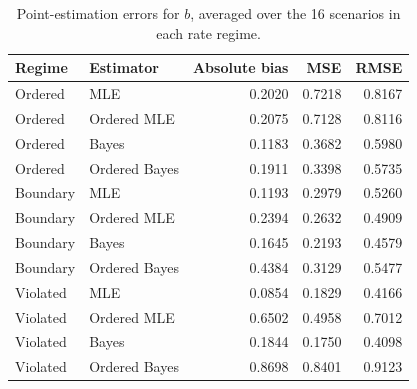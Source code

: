 \begin{table}[htbp]
\centering
\caption{Point-estimation errors for $b$, averaged over the 16 scenarios in each rate regime.}\label{tab:stress_rate}
\small
\begin{tabular}{llrrr}
\toprule
Regime & Estimator & Absolute bias & MSE & RMSE \\
\midrule
Ordered & MLE & 0.2020 & 0.7218 & 0.8167 \\
Ordered & Ordered MLE & 0.2075 & 0.7128 & 0.8116 \\
Ordered & Bayes & 0.1183 & 0.3682 & 0.5980 \\
Ordered & Ordered Bayes & 0.1911 & 0.3398 & 0.5735 \\
Boundary & MLE & 0.1193 & 0.2979 & 0.5260 \\
Boundary & Ordered MLE & 0.2394 & 0.2632 & 0.4909 \\
Boundary & Bayes & 0.1645 & 0.2193 & 0.4579 \\
Boundary & Ordered Bayes & 0.4384 & 0.3129 & 0.5477 \\
Violated & MLE & 0.0854 & 0.1829 & 0.4166 \\
Violated & Ordered MLE & 0.6502 & 0.4958 & 0.7012 \\
Violated & Bayes & 0.1844 & 0.1750 & 0.4098 \\
Violated & Ordered Bayes & 0.8698 & 0.8401 & 0.9123 \\
\bottomrule
\end{tabular}
\end{table}
